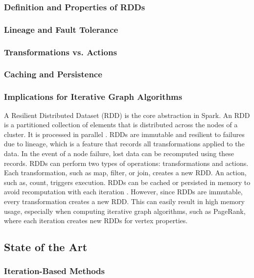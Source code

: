 \subsubsection{Definition and Properties of RDDs}
\subsubsection{Lineage and Fault Tolerance}
\subsubsection{Transformations vs. Actions}
\subsubsection{Caching and Persistence}
\subsubsection{Implications for Iterative Graph Algorithms}

A Resilient Distributed Dataset (RDD) is the core abstraction in Spark. An RDD is a partitioned collection of elements that is distributed across the nodes of a cluster. It is processed in parallel \cite{apache_spark_rdd_2025}. RDDs are immutable and resilient to failures due to lineage, which is a feature that records all transformations applied to the data. In the event of a node failure, lost data can be recomputed using these records. RDDs can perform two types of operations: transformations and actions. Each transformation, such as map, filter, or join, creates a new RDD. An action, such as, count, triggers execution. RDDs can be cached or persisted in memory to avoid recomputation with each iteration \cite{chambers_spark_2018}. However, since RDDs are immutable, every transformation creates a new RDD. This can easily result in high memory usage, especially when computing iterative graph algorithms, such as PageRank, where each iteration creates new RDDs for vertex properties. 



\subsection{State of the Art}

\subsubsection{Iteration-Based Methods}

